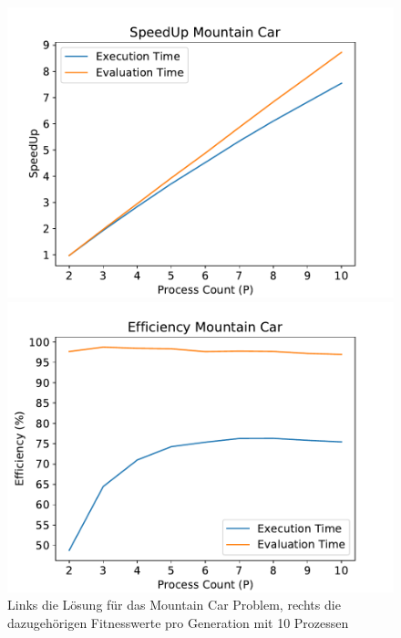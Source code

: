 \begin{figure}[!h]
	\centering
	\begin{minipage}[]{0.49\textwidth}
		\includegraphics[width=1.0\textwidth]{./img/mountain_car_analysis/mountain_car_speedup_2_10.pdf} 
	\end{minipage}
	\hfill
	\begin{minipage}[]{0.49\textwidth}
		\includegraphics[width=1.0\textwidth]{./img/mountain_car_analysis/efficecny mountain_car_2_10.pdf} 
	\end{minipage}
	\caption{Links die Lösung für das Mountain Car Problem, rechts die dazugehörigen Fitnesswerte pro Generation mit 10 Prozessen}
	\label{fig:mountain_car_2_10_efficiency_speedup}
\end{figure}

